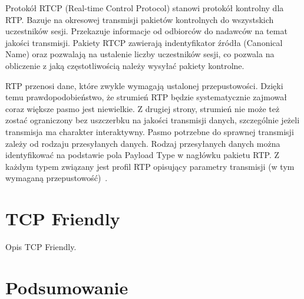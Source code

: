 Protokół RTCP (Real-time Control Protocol) stanowi protokół kontrolny dla RTP. Bazuje na okresowej transmisji pakietów kontrolnych do wszystskich uczestników sesji. Przekazuje informacje od odbiorców do nadawców na temat jakości transmisji. Pakiety RTCP zawierają indentyfikator źródła (Canonical Name) oraz pozwalają na ustalenie liczby uczestników sesji, co pozwala na obliczenie z jaką częstotliwością należy wysyłać pakiety kontrolne.

RTP przenosi dane, które zwykle wymagają ustalonej przepustowości. Dzięki temu prawdopodobieństwo, że strumień RTP będzie systematycznie zajmował coraz większe pasmo jest niewielkie. Z drugiej strony, strumień nie może też zostać ograniczony bez uszczerbku na jakości transmisji danych, szczególnie jeżeli transmisja ma charakter interaktywny. Pasmo potrzebne do sprawnej transmisji zależy od rodzaju przesyłanych danych. Rodzaj przesyłanych danych można identyfikować na podstawie pola Payload Type w nagłówku pakietu RTP. Z każdym typem związany jest profil RTP opisujący parametry transmisji (w tym wymaganą przepustowość)~\cite{RFC3551}. 

\section{TCP Friendly}

Opis TCP Friendly.

\section{Podsumowanie}